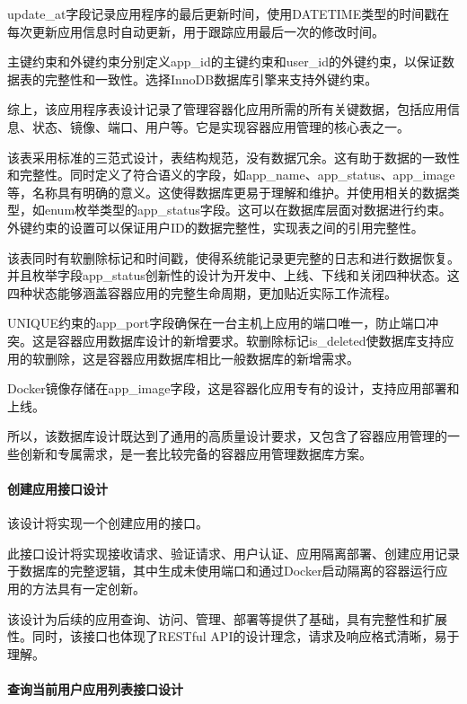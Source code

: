 \documentclass{HDU-Bachelor-Thesis}
\begin{document}
update\_at字段记录应用程序的最后更新时间，使用DATETIME类型的时间戳在每次更新应用信息时自动更新，用于跟踪应用最后一次的修改时间。

主键约束和外键约束分别定义app\_id的主键约束和user\_id的外键约束，以保证数据表的完整性和一致性。选择InnoDB数据库引擎来支持外键约束。

综上，该应用程序表设计记录了管理容器化应用所需的所有关键数据，包括应用信息、状态、镜像、端口、用户等。它是实现容器应用管理的核心表之一。

该表采用标准的三范式设计，表结构规范，没有数据冗余。这有助于数据的一致性和完整性。同时定义了符合语义的字段，如app\_name、app\_status、app\_image等，名称具有明确的意义。这使得数据库更易于理解和维护。并使用相关的数据类型，如enum枚举类型的app\_status字段。这可以在数据库层面对数据进行约束。外键约束的设置可以保证用户ID的数据完整性，实现表之间的引用完整性。

该表同时有软删除标记和时间戳，使得系统能记录更完整的日志和进行数据恢复。并且枚举字段app\_status创新性的设计为开发中、上线、下线和关闭四种状态。这四种状态能够涵盖容器应用的完整生命周期，更加贴近实际工作流程。

UNIQUE约束的app\_port字段确保在一台主机上应用的端口唯一，防止端口冲突。这是容器应用数据库设计的新增要求。软删除标记is\_deleted使数据库支持应用的软删除，这是容器应用数据库相比一般数据库的新增需求。

Docker镜像存储在app\_image字段，这是容器化应用专有的设计，支持应用部署和上线。

所以，该数据库设计既达到了通用的高质量设计要求，又包含了容器应用管理的一些创新和专属需求，是一套比较完备的容器应用管理数据库方案。

\paragraph{创建应用接口设计}

该设计将实现一个创建应用的接口。

此接口设计将实现接收请求、验证请求、用户认证、应用隔离部署、创建应用记录于数据库的完整逻辑，其中生成未使用端口和通过Docker启动隔离的容器运行应用的方法具有一定创新。

该设计为后续的应用查询、访问、管理、部署等提供了基础，具有完整性和扩展性。同时，该接口也体现了RESTful API的设计理念，请求及响应格式清晰，易于理解。

\paragraph{查询当前用户应用列表接口设计}
\end{document}
